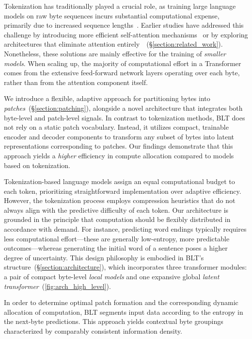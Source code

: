 Tokenization has traditionally played a crucial role, as training large language models on raw byte sequences incurs substantial computational expense, primarily due to increased sequence lengths~\citep{xue2022byt5}. Earlier studies have addressed this challenge by introducing more efficient self-attention mechanisms~\citep{el2020characterbert, clark2022canine} or by exploring architectures that eliminate attention entirely~\citep{wang2024mambabyte}~(\S\ref{section:related_work}). Nonetheless, these solutions are mainly effective for the training of \textit{smaller models}. When scaling up, the majority of computational effort in a Transformer comes from the extensive feed-forward network layers operating over each byte, rather than from the attention component itself.

We introduce a flexible, adaptive approach for partitioning bytes into \textit{patches}~(\S\ref{section:patching}), alongside a novel architecture that integrates both byte-level and patch-level signals. In contrast to tokenization methods, {\textsc BLT} does not rely on a static patch vocabulary. Instead, it utilizes compact, trainable encoder and decoder components to transform any subset of bytes into latent representations corresponding to patches. Our findings demonstrate that this approach yields a \textit{higher} efficiency in compute allocation compared to models based on tokenization.

Tokenization-based language models assign an equal computational budget to each token, prioritizing straightforward implementation over adaptive efficiency. However, the tokenization process employs compression heuristics that do not always align with the predictive difficulty of each token. Our architecture is grounded in the principle that computation should be flexibly distributed in accordance with demand. For instance, predicting word endings typically requires less computational effort—these are generally low-entropy, more predictable outcomes—whereas generating the initial word of a sentence poses a higher degree of uncertainty. This design philosophy is embodied in {\textsc BLT}'s structure~(\S\ref{section:architecture}), which incorporates three transformer modules: a pair of compact byte-level \textit{local models} and one expansive global \textit{latent transformer}~(\autoref{fig:arch_high_level}).

In order to determine optimal patch formation and the corresponding dynamic allocation of computation, {\textsc BLT} segments input data according to the entropy in the next-byte predictions. This approach yields contextual byte groupings characterized by comparably consistent information density.


